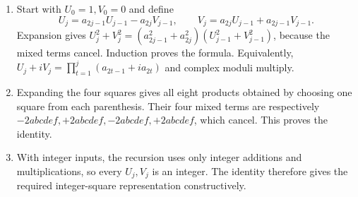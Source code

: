 \begin{enumerate}
\item Start with $U_0=1,V_0=0$ and define
\[
U_j=a_{2j-1}U_{j-1}-a_{2j}V_{j-1},\qquad
V_j=a_{2j}U_{j-1}+a_{2j-1}V_{j-1}.
\]
Expansion gives $U_j^2+V_j^2=(a_{2j-1}^2+a_{2j}^2)(U_{j-1}^2+V_{j-1}^2)$, because the mixed terms cancel. Induction proves the formula. Equivalently, $U_j+iV_j=\prod_{t=1}^j(a_{2t-1}+ia_{2t})$ and complex moduli multiply.
\item Expanding the four squares gives all eight products obtained by choosing one square from each parenthesis. Their four mixed terms are respectively $-2abcdef,+2abcdef,-2abcdef,+2abcdef$, which cancel. This proves the identity.
\item With integer inputs, the recursion uses only integer additions and multiplications, so every $U_j,V_j$ is an integer. The identity therefore gives the required integer-square representation constructively.
\end{enumerate}

